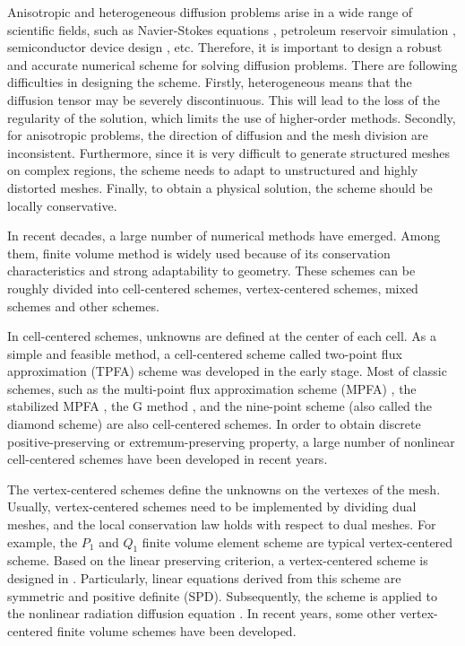 \documentclass[times,review,preprint]{elsarticle}
\begin{document}
Anisotropic and heterogeneous diffusion problems arise in a wide range of scientific fields, such as Navier-Stokes equations \cite{Versteeg1995, Leveque2002}, petroleum reservoir simulation \cite{Cavalcante2020, Schneider2018, Contreras2016}, semiconductor device design \cite{Markowich1990}, etc. Therefore, it is important to design a robust and accurate numerical scheme for solving diffusion problems. 
There are following difficulties in designing the scheme. 
Firstly, heterogeneous means that the diffusion tensor may be severely discontinuous. This will lead to the loss of the regularity of the solution, which limits the use of higher-order methods.
Secondly, for anisotropic problems, the direction of diffusion and the mesh division are inconsistent.
Furthermore, since it is very difficult to generate structured meshes on complex regions, the scheme needs to adapt to unstructured and highly distorted meshes. 
Finally, to obtain a physical solution, the scheme should be locally conservative.

In recent decades, a large number of numerical methods have emerged. Among them, finite volume method is widely used because of its conservation characteristics and strong adaptability to geometry. These schemes can be roughly divided into cell-centered schemes, vertex-centered schemes, mixed schemes and other schemes.

In cell-centered schemes, unknowns are defined at the center of each cell. 
As a simple and feasible method, a cell-centered scheme called two-point flux approximation (TPFA) scheme was developed in the early stage. Most of classic schemes, such as the multi-point flux approximation scheme (MPFA) \cite{Aavatsmark1998, Aavatsmark2002}, the stabilized MPFA \cite{Aavatsmark2008}, the G method \cite{Agelas2010}, and the nine-point scheme (also called the diamond scheme) \cite{li1980, Yves1999, GaoWu2011, MiaoWu2022} are also cell-centered schemes. In order to obtain discrete positive-preserving or extremum-preserving property, a large number of nonlinear cell-centered schemes \cite{Potier-CL, Lipnikov2007, yuan2008, Lipnikov2012, Gao-Wu2015, Terekhov2017} have been developed in recent years.

The vertex-centered schemes define the unknowns on the vertexes of the mesh. 
Usually, vertex-centered schemes need to be implemented by dividing dual meshes, and the local conservation law holds with respect to dual meshes. For example, the $P_1$ and $Q_1$ finite volume element scheme \cite{Cai1991, Li2000, Chatzipantelidis} are typical vertex-centered scheme. Based on the linear preserving criterion, a vertex-centered scheme is designed in \cite{Wu-Gao-Dai}. Particularly, linear equations derived from this scheme are symmetric and positive definite (SPD). Subsequently, the scheme is applied to the nonlinear radiation diffusion equation \cite{Wuj2017}. In recent years, some other vertex-centered finite volume schemes \cite{Edwards2002, Edwards-Zheng} have been developed.
\end{document}
